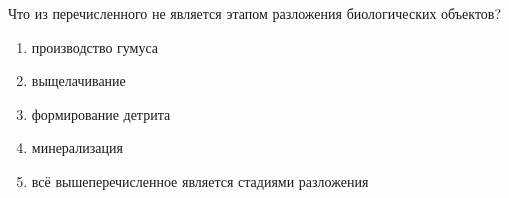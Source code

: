 
Что из перечисленного
не является этапом разложения биологических объектов?

\begin{enumerate}
    \item производство гумуса
    \item выщелачивание
    \item формирование детрита
    \item минерализация
    \item всё вышеперечисленное является стадиями разложения
\end{enumerate}

\explanationSection

